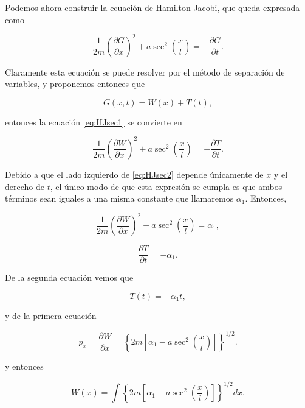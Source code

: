 \documentclass[a4paper,10pt]{article}
\numberwithin{equation}{section}
\begin{document}
Podemos ahora construir la ecuación de Hamilton-Jacobi, que queda expresada como 

\begin{equation}
 \frac{1}{2m}\left(\frac{\partial G}{\partial x}\right)^2 + 
 a\sec^2{\left(\frac{x}{l}\right)} = - \frac{\partial G}{\partial t}.
 \label{eq:HJsec1}
\end{equation}

Claramente esta ecuación se puede resolver por el método de separación de variables,
y proponemos entonces que

\begin{equation}
 G(x,t) = W(x)+ T(t),
\end{equation}

entonces la ecuación \eqref{eq:HJsec1} se convierte en 

\begin{equation}
 \frac{1}{2m}\left(\frac{\partial W}{\partial x}\right)^2 + 
 a\sec^2{\left(\frac{x}{l}\right)} = - \frac{\partial T}{\partial t}.
 \label{eq:HJsec2}
\end{equation}

Debido a que el lado izquierdo de \eqref{eq:HJsec2} depende únicamente de $x$ y el derecho de $t$, el único 
modo de que esta expresión se cumpla es que ambos términos sean iguales a una misma 
constante que llamaremos $\alpha_1$. Entonces,

\begin{equation}
  \frac{1}{2m}\left(\frac{\partial W}{\partial x}\right)^2 + 
 a\sec^2{\left(\frac{x}{l}\right)} = \alpha_1,
\end{equation}

\begin{equation}
 \frac{\partial T}{\partial t} = - \alpha_1.
\end{equation}

De la segunda ecuación vemos que 

\begin{equation}
 T(t) = - \alpha_1t,
\end{equation}

y de la primera ecuación

\begin{equation}
 p_x = \frac{\partial W}{\partial x} = \left\{2m\left[\alpha_1 - a\sec^2{\left(\frac{x}{l}\right)}\right]\right\}^{1/2}.
\end{equation}

y entonces 

\begin{equation}
 W(x) = \int \left\{2m\left[\alpha_1 - a\sec^2{\left(\frac{x}{l}\right)}\right]\right\}^{1/2}dx.
\end{equation}
\end{document}
